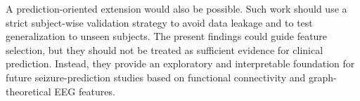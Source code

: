 A prediction-oriented extension would also be possible. Such work should use a
strict subject-wise validation strategy to avoid data leakage and to test
generalization to unseen subjects. The present findings could guide feature
selection, but they should not be treated as sufficient evidence for clinical
prediction. Instead, they provide an exploratory and interpretable foundation
for future seizure-prediction studies based on functional connectivity and
graph-theoretical EEG features.